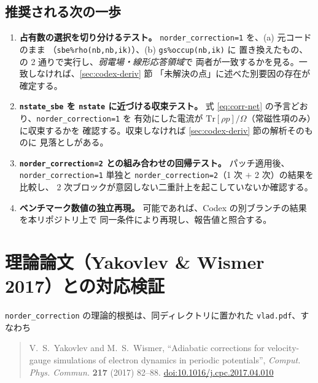 \documentclass[dvipdfmx,a4paper,11pt]{jsarticle}
\newcommand{\file}[1]{\texttt{#1}}
\newcommand{\Tr}{\mathrm{Tr}}
\begin{document}
\subsection{推奨される次の一歩}

\begin{enumerate}
\item \textbf{占有数の選択を切り分けるテスト。}
      \file{norder\_correction=1} を、(a) 元コードのまま
      （\verb|sbe%rho(nb,nb,ik)|）、(b) \verb|gs%occup(nb,ik)| に
      置き換えたもの、の 2 通りで実行し、\emph{弱電場・線形応答領域}で
      両者が一致するかを見る。一致しなければ、\ref{sec:codex-deriv} 節
      「未解決の点」に述べた別要因の存在が確定する。
\item \textbf{\file{nstate\_sbe} を \file{nstate} に近づける収束テスト。}
      式 \eqref{eq:corr-net} の予言どおり、\file{norder\_correction=1} を
      有効にした電流が $\Tr[\rho p]/\Omega$（常磁性項のみ）に収束するかを
      確認する。収束しなければ \ref{sec:codex-deriv} 節の解析そのものに
      見落としがある。
\item \textbf{\file{norder\_correction=2} との組み合わせの回帰テスト。}
      パッチ適用後、\file{norder\_correction=1} 単独と
      \file{norder\_correction=2}（1 次 $+$ 2 次）の結果を比較し、
      2 次ブロックが意図しない二重計上を起こしていないか確認する。
\item \textbf{ベンチマーク数値の独立再現。}
      可能であれば、Codex の別ブランチの結果を本リポジトリ上で
      同一条件により再現し、報告値と照合する。
\end{enumerate}

\section{理論論文（Yakovlev \& Wismer 2017）との対応検証}
\label{sec:vlad}

\file{norder\_correction} の理論的根拠は、同ディレクトリに置かれた
\file{vlad.pdf}、すなわち

\begin{quote}
V.~S.~Yakovlev and M.~S.~Wismer,
``Adiabatic corrections for velocity-gauge simulations of electron dynamics
in periodic potentials'',
\emph{Comput. Phys. Commun.} \textbf{217} (2017) 82--88.
\href{https://doi.org/10.1016/j.cpc.2017.04.010}{doi:10.1016/j.cpc.2017.04.010}
\end{quote}
\end{document}
